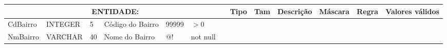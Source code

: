 \begin{center}
       \begin{longtable}{|p{2cm}|p{2cm}|p{1cm}|p{3.5cm}|p{1.8cm}|p{1.5cm}|p{2cm}|}
       
            \hline
            
            \multicolumn{7}{|c|}{
                \textbf{ENTIDADE: {\color{blue}{BAIRRO}}}
            } \endhead \hline
            
            \textbf{Nome} & 
            \textbf{Tipo} &
            \textbf{Tam}  &
            \textbf{Descrição} &
            \textbf{Máscara} &
            \textbf{Regra} &
            \textbf{Valores válidos} \\ \hline
            
            CdBairro &
            INTEGER &
            5 &
            Código do Bairro &
            99999 &
            $> 0$ & \\ \hline
            
            NmBairro &
            VARCHAR &
            40 &
            Nome do Bairro &
            @! &
            not null & \\ \hline

       \end{longtable}
       
       
   \end{center}
   
   \noindent {}